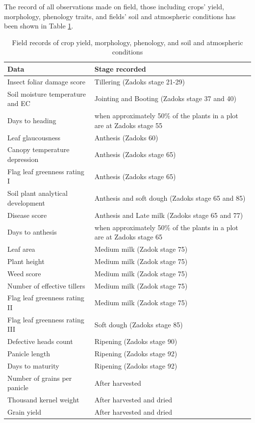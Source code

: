\documentclass[12pt,oneside]{dukestatscithesis} %
\theoremstyle{definition}
\theoremstyle{definition}
\theoremstyle{definition}
\theoremstyle{remark}
\begin{document}
The record of all observations made on field, those including crops'
yield, morphology, phenology traits, and fields' soil and atmospheric
conditions has been shown in Table \ref{tab:yld-morph-md}.
\begin{longtable}[t]{>{\raggedright\arraybackslash}p{5.2cm}>{\raggedright\arraybackslash}p{8.2cm}}
\caption{\label{tab:yld-morph-md}Field records of crop yield, morphology, phenology, and soil and atmospheric conditions}\\
\toprule
Data & Stage recorded\\
\midrule
Insect foliar damage score & Tillering (Zadoks stage 21-29)\\
Soil moisture temperature and EC & Jointing and Booting (Zadoks stage 37 and 40)\\
Days to heading & when approximately 50\% of the plants in a plot are at Zadoks stage 55\\
Leaf glaucousness & Anthesis (Zadoks 60)\\
Canopy temperature depression & Anthesis (Zadoks stage 65)\\
\addlinespace
Flag leaf greenness rating I & Anthesis (Zadoks stage 65)\\
Soil plant analytical development & Anthesis and soft dough (Zadoks stage 65 and 85)\\
Disease score & Anthesis and Late milk (Zadoks stage 65 and 77)\\
Days to anthesis & when approximately 50\% of the plants in a plot are at Zadoks stage 65\\
Leaf area & Medium milk (Zadok stage 75)\\
\addlinespace
Plant height & Medium milk (Zadok stage 75)\\
Weed score & Medium milk (Zadok stage 75)\\
Number of effective tillers & Medium milk (Zadok stage 75)\\
Flag leaf greenness rating II & Medium milk (Zadok stage 75)\\
Flag leaf greenness rating III & Soft dough (Zadoks stage 85)\\
\addlinespace
Defective heads count & Ripening (Zadoks stage 90)\\
Panicle length & Ripening (Zadoks stage 92)\\
Days to maturity & Ripening (Zadoks stage 92)\\
Number of grains per panicle & After harvested\\
Thousand kernel weight & After harvested and dried\\
Grain yield & After harvested and dried\\
\bottomrule
\end{longtable}
\end{document}
